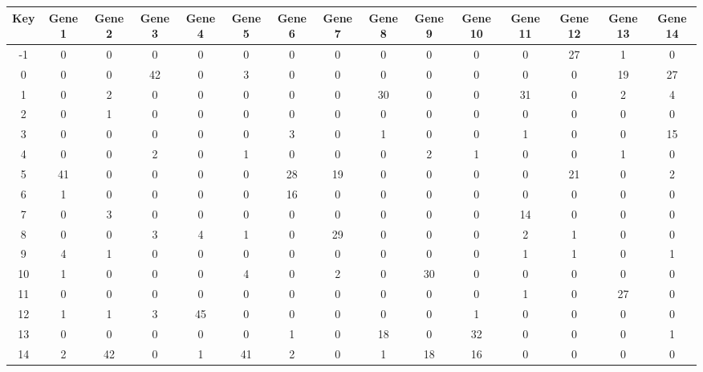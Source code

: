 \begin{tabular}{|c|c|c|c|c|c|c|c|c|c|c|c|c|c|c|}
\hline
Key & Gene 1 & Gene 2 & Gene 3 & Gene 4 & Gene 5 & Gene 6 & Gene 7 & Gene 8 & Gene 9 & Gene 10 & Gene 11 & Gene 12 & Gene 13 & Gene 14 \\
\hline
-1 & 0 & 0 & 0 & 0 & 0 & 0 & 0 & 0 & 0 & 0 & 0 & 27 & 1 & 0 \\
0 & 0 & 0 & 42 & 0 & 3 & 0 & 0 & 0 & 0 & 0 & 0 & 0 & 19 & 27 \\
1 & 0 & 2 & 0 & 0 & 0 & 0 & 0 & 30 & 0 & 0 & 31 & 0 & 2 & 4 \\
2 & 0 & 1 & 0 & 0 & 0 & 0 & 0 & 0 & 0 & 0 & 0 & 0 & 0 & 0 \\
3 & 0 & 0 & 0 & 0 & 0 & 3 & 0 & 1 & 0 & 0 & 1 & 0 & 0 & 15 \\
4 & 0 & 0 & 2 & 0 & 1 & 0 & 0 & 0 & 2 & 1 & 0 & 0 & 1 & 0 \\
5 & 41 & 0 & 0 & 0 & 0 & 28 & 19 & 0 & 0 & 0 & 0 & 21 & 0 & 2 \\
6 & 1 & 0 & 0 & 0 & 0 & 16 & 0 & 0 & 0 & 0 & 0 & 0 & 0 & 0 \\
7 & 0 & 3 & 0 & 0 & 0 & 0 & 0 & 0 & 0 & 0 & 14 & 0 & 0 & 0 \\
8 & 0 & 0 & 3 & 4 & 1 & 0 & 29 & 0 & 0 & 0 & 2 & 1 & 0 & 0 \\
9 & 4 & 1 & 0 & 0 & 0 & 0 & 0 & 0 & 0 & 0 & 1 & 1 & 0 & 1 \\
10 & 1 & 0 & 0 & 0 & 4 & 0 & 2 & 0 & 30 & 0 & 0 & 0 & 0 & 0 \\
11 & 0 & 0 & 0 & 0 & 0 & 0 & 0 & 0 & 0 & 0 & 1 & 0 & 27 & 0 \\
12 & 1 & 1 & 3 & 45 & 0 & 0 & 0 & 0 & 0 & 1 & 0 & 0 & 0 & 0 \\
13 & 0 & 0 & 0 & 0 & 0 & 1 & 0 & 18 & 0 & 32 & 0 & 0 & 0 & 1 \\
14 & 2 & 42 & 0 & 1 & 41 & 2 & 0 & 1 & 18 & 16 & 0 & 0 & 0 & 0 \\
\hline
\end{tabular}